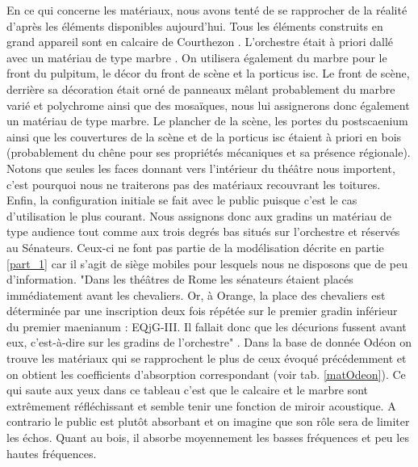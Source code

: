 En ce qui concerne les matériaux, nous avons tenté de se rapprocher de la réalité d'après les éléments disponibles aujourd'hui. Tous les éléments construits en grand appareil sont en calcaire de Courthezon \cite[p.43]{orangeTxt}. L'orchestre était à priori dallé avec un matériau de type marbre \cite[p.337]{orangeTxt}. On utilisera également du marbre pour le front du \gls{pulpitum}, le décor du front de scène et la \gls{porticus isc}. Le front de scène, derrière sa décoration était orné de panneaux mêlant probablement du marbre varié et polychrome ainsi que des mosaïques, nous lui assignerons donc également un matériau de type marbre. Le plancher de la scène, les portes du \gls{postscaenium} ainsi que les couvertures de la scène et de la \gls{porticus isc} étaient à priori en bois (probablement du chêne pour ses propriétés mécaniques et sa présence régionale). Notons que seules les faces donnant vers l'intérieur du théâtre nous importent, c'est pourquoi nous ne traiterons pas des matériaux recouvrant les toitures. Enfin, la configuration initiale se fait avec le public puisque c'est le cas d'utilisation le plus courant. Nous assignons donc aux gradins un matériau de type audience tout comme aux trois degrés bas situés sur l'orchestre et réservés au Sénateurs. Ceux-ci ne font pas partie de la modélisation décrite en partie \ref{part_1} car il s'agit de siège mobiles pour lesquels nous ne disposons que de peu d'information. "Dans les théâtres de Rome les sénateurs étaient placés immédiatement avant les chevaliers. Or, à Orange, la place des chevaliers est déterminée par une inscription deux fois répétée sur le premier gradin inférieur du premier \gls{maenianum} : EQjG-III. Il fallait donc que les décurions fussent avant eux, c'est-à-dire sur les gradins de l'orchestre" \cite[p.46]{formige}. Dans la base de donnée Odéon \cite[materials]{odeon} on trouve les matériaux qui se rapprochent le plus de ceux évoqué précédemment et on obtient les coefficients d'absorption correspondant (voir tab. \ref{matOdeon}). Ce qui saute aux yeux dans ce tableau c'est que le calcaire et le marbre sont extrêmement réfléchissant et semble tenir une fonction de miroir acoustique. A contrario le public est plutôt absorbant et on imagine que son rôle sera de limiter les échos. Quant au bois, il absorbe moyennement les basses fréquences et peu les hautes fréquences.
%
